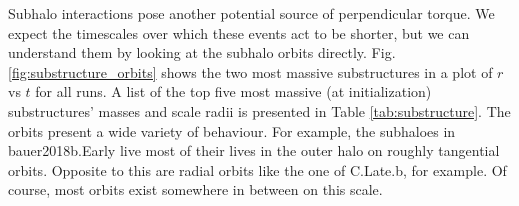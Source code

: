  
Subhalo interactions pose another potential source of perpendicular torque. We expect the timescales over which these events act to be shorter, but we can understand them by looking at the subhalo orbits directly. Fig. \ref{fig:substructure_orbits} shows the two most massive substructures in a plot of $r$ vs $t$ for all runs. A list of the top five most massive (at initialization) substructures' masses and scale radii is presented in Table \ref{tab:substructure}. The orbits present a wide variety of behaviour. For example, the subhaloes in bauer2018b.Early live most of their lives in the outer halo on roughly tangential orbits. Opposite to this are radial orbits like the one of C.Late.b, for example. Of course, most orbits exist somewhere in between on this scale. 



